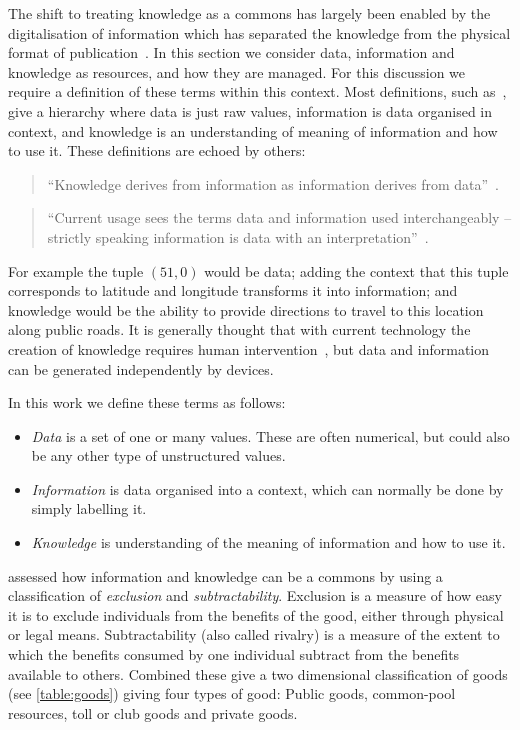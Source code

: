 The shift to treating knowledge as a commons has largely been enabled by the digitalisation of information which has separated the knowledge from the physical format of publication~\citep{Ostrom2003}. 
In this section we consider data, information and knowledge as resources, and how they are managed. 
For this discussion we require a definition of these terms within this context.
Most definitions, such as~\citet{Machlup1983}, give a hierarchy where data is just raw values, information is data organised in context, and knowledge is an understanding of meaning of information and how to use it. These definitions are echoed by others:

\begin{quote}
``Knowledge derives from information as information derives from data''~\citep[p.6]{Davenport2000}.
\end{quote}
\begin{quote}
``Current usage sees the terms data and information used interchangeably -- strictly speaking information is
data with an interpretation''~\citep[p.203]{Shadbolt2013}.
\end{quote}

For example the tuple $(51,0)$ would be data; adding the context that this tuple corresponds to latitude and longitude transforms it into information; and knowledge would be the ability to provide directions to travel to this location along public roads. It is generally thought that with current technology the creation of knowledge requires human intervention~\citep{Davenport2000}, but data and information can be generated independently by devices. 

In this work we define these terms as follows:
\begin{itemize}
\item \emph{Data} is a set of one or many values. These are often numerical, but could also be any other type of unstructured values.
\item \emph{Information} is data organised into a context, which can normally be done by simply labelling it.
\item \emph{Knowledge} is understanding of the meaning of information and how to use it.
\end{itemize}

\citet{Ostrom2003} assessed how information and knowledge can be a commons by using a classification of \emph{exclusion} and \emph{subtractability}. 
Exclusion is a measure of how easy it is to exclude individuals from the benefits of the good, either through physical or legal means. 
Subtractability (also called rivalry) is a measure of the extent to which the benefits consumed by one individual subtract from the benefits available to others. 
Combined these give a two dimensional classification of goods (see \autoref{table:goods}) giving four types of good: Public goods, common-pool resources, toll or club goods and private goods.


